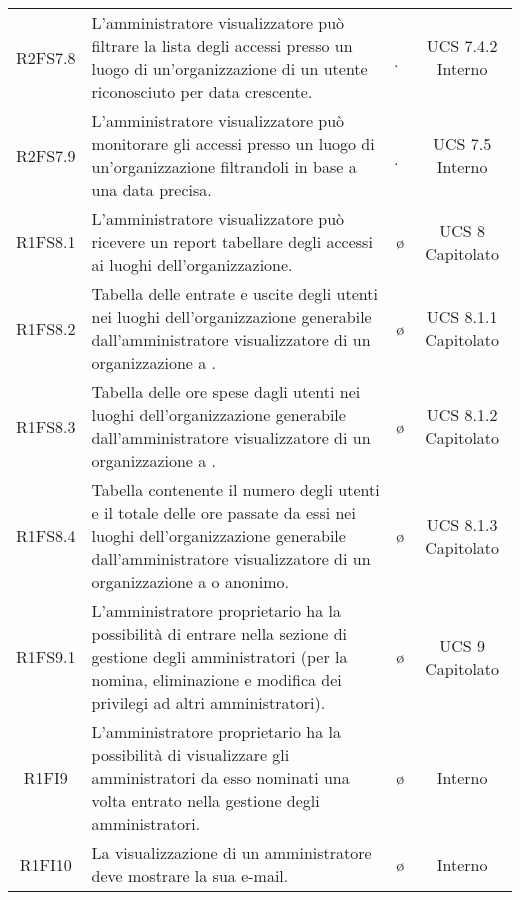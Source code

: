{\begin{longtable}{ c C{6.5cm} c c}
R2FS7.8 & L’amministratore visualizzatore può filtrare la lista degli accessi presso un luogo di un'organizzazione di un utente riconosciuto per data crescente. & \d & UCS 7.4.2 Interno \\

R2FS7.9 & L'amministratore visualizzatore può monitorare gli accessi presso un luogo di un'organizzazione filtrandoli in base a una data precisa. & \d & UCS 7.5 Interno\\

R1FS8.1 & L'amministratore visualizzatore può ricevere un report tabellare degli accessi ai luoghi dell'organizzazione. & \o & UCS 8 Capitolato\\

R1FS8.2 &  Tabella delle entrate e uscite degli utenti nei luoghi dell'organizzazione generabile dall'amministratore visualizzatore di un organizzazione a . & \o & UCS 8.1.1 Capitolato\\

R1FS8.3 & Tabella delle ore spese dagli utenti nei luoghi dell'organizzazione generabile dall'amministratore visualizzatore di un organizzazione a . & \o & UCS 8.1.2 Capitolato\\

R1FS8.4 & Tabella contenente il numero degli utenti e il totale delle ore passate da essi nei luoghi dell'organizzazione generabile dall'amministratore visualizzatore di un organizzazione a  o anonimo. & \o & UCS 8.1.3 Capitolato\\




R1FS9.1 & L'amministratore proprietario ha la possibilità di entrare nella sezione di gestione degli amministratori (per la nomina, eliminazione e modifica dei privilegi ad altri amministratori). & \o & UCS 9 Capitolato \\

R1FI9 & L'amministratore proprietario ha la possibilità di visualizzare gli amministratori da esso nominati una volta entrato nella gestione degli amministratori. & \o & Interno \\

R1FI10 & La visualizzazione di un amministratore deve mostrare la sua e-mail. & \o & Interno \\


\end{longtable}}
